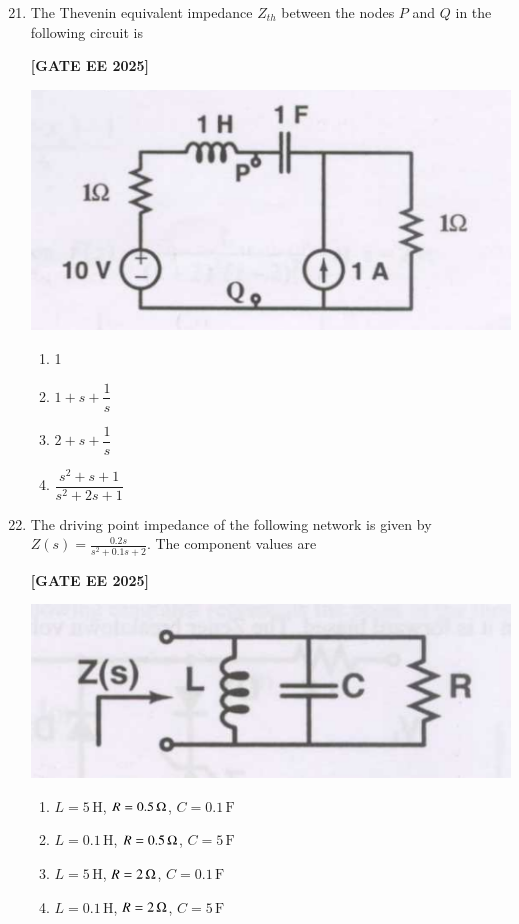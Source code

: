 \documentclass[12pt]{article}
\begin{document}
\begin{enumerate}[leftmargin=*, label=\textbf{Q.\arabic*:}]
\setcounter{enumi}{20}

\item The Thevenin equivalent impedance $Z_{th}$ between the nodes $P$ and $Q$ in the following circuit is
 
\noindent \textbf{[GATE EE 2025]}
\begin{center}
\includegraphics[width=0.7\columnwidth]{figs/q21.png}
\end{center}
\begin{enumerate}
  \item 1
  \item $1+s+\dfrac{1}{s}$
  \item $2+s+\dfrac{1}{s}$
  \item $\dfrac{s^2+s+1}{s^2+2s+1}$
\end{enumerate}

\item The driving point impedance of the following network is given by $Z(s)=\frac{0.2s}{s^2+0.1s+2}$. The component values are
 
\noindent \textbf{[GATE EE 2025]}
\begin{center}
\includegraphics[width=0.7\columnwidth]{figs/q22.png}
\end{center}

\begin{enumerate}
  \item $L=5\,\text{H}$, $R=0.5\,\ohm$, $C=0.1\,\text{F}$
  \item $L=0.1\,\text{H}$, $R=0.5\,\ohm$, $C=5\,\text{F}$
  \item $L=5\,\text{H}$, $R=2\,\ohm$, $C=0.1\,\text{F}$
  \item $L=0.1\,\text{H}$, $R=2\,\ohm$, $C=5\,\text{F}$
\end{enumerate}


\end{enumerate}
\end{document}
